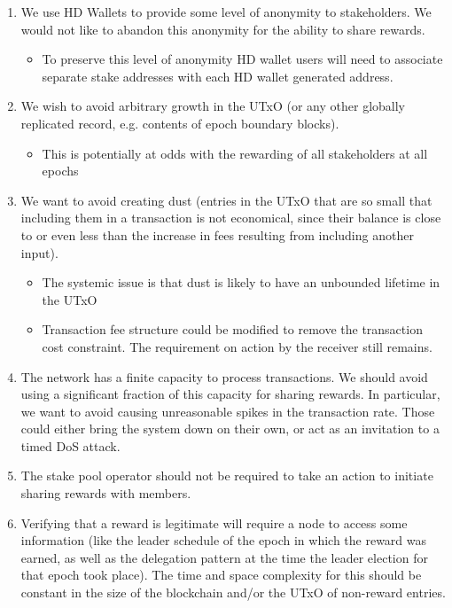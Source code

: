 \documentclass[11pt,a4paper,dvipsnames,twosided]{article}
\begin{document}
\begin{enumerate}
\item
  We use HD Wallets to provide some level of anonymity to stakeholders.
  We would not like to abandon this anonymity for the ability to share
  rewards.

  \begin{itemize}
  \item
    To preserve this level of anonymity HD wallet users will need to
    associate separate stake addresses with each HD wallet generated
    address.
  \end{itemize}
\item
  We wish to avoid arbitrary growth in the UTxO (or any other globally
  replicated record, e.g. contents of epoch boundary blocks).

  \begin{itemize}
  \item
    This is potentially at odds with the rewarding of all stakeholders
    at all epochs
  \end{itemize}
\item
  We want to avoid creating dust (entries in the UTxO that are so small
  that including them in a transaction is not economical, since their
  balance is close to or even less than the increase in fees resulting
  from including another input).

  \begin{itemize}
  \item
    The systemic issue is that dust is likely to have an unbounded
    lifetime in the UTxO
  \item
    Transaction fee structure could be modified to remove the
    transaction cost constraint. The requirement on action by the
    receiver still remains.
  \end{itemize}
\item
  The network has a finite capacity to process transactions. We should
  avoid using a significant fraction of this capacity for sharing
  rewards. In particular, we want to avoid causing unreasonable spikes
  in the transaction rate. Those could either bring the system down on
  their own, or act as an invitation to a timed DoS attack.
\item
  The stake pool operator should not be required to take an action to
  initiate sharing rewards with members.
\item
  Verifying that a reward is legitimate will require a node to access
  some information (like the leader schedule of the epoch in which the
  reward was earned, as well as the delegation pattern at the time the
  leader election for that epoch took place). The time and space
  complexity for this should be constant in the size of the blockchain
  and/or the UTxO of non-reward entries.
\end{enumerate}
\end{document}
